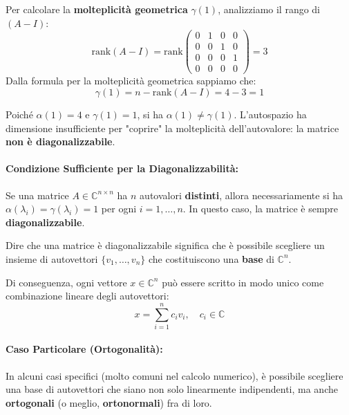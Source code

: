 \documentclass[a4paper,12pt]{article}
\begin{document}
	\medskip
	\noindent Per calcolare la \textbf{molteplicità geometrica} $\gamma(1)$, analizziamo il rango di $(A - I)$:
	\[
	\text{rank}(A - I) = \text{rank} \begin{pmatrix} 
		0 & 1 & 0 & 0 \\ 
		0 & 0 & 1 & 0 \\ 
		0 & 0 & 0 & 1 \\ 
		0 & 0 & 0 & 0 
	\end{pmatrix} = 3
	\]
	Dalla formula per la molteplicità geometrica sappiamo che:
	\[ \gamma(1) = n - \text{rank}(A - I) = 4 - 3 = 1 \]
	
	\begin{tcolorbox}[colback=red!5!white, colframe=red!75!black]
		Poiché $\alpha(1) = 4$ e $\gamma(1) = 1$, si ha $\alpha(1) \neq \gamma(1)$. 
		L'autospazio ha dimensione insufficiente per "coprire" la molteplicità dell'autovalore: la matrice \textbf{non è diagonalizzabile}.
	\end{tcolorbox}
	\paragraph{Condizione Sufficiente per la Diagonalizzabilità:}
	Se una matrice $A \in \mathbb{C}^{n \times n}$ ha $n$ autovalori \textbf{distinti}, allora necessariamente si ha $\alpha(\lambda_i) = \gamma(\lambda_i) = 1$ per ogni $i = 1, \dots, n$. In questo caso, la matrice è sempre \textbf{diagonalizzabile}.
	
	\begin{tcolorbox}[title=Interpretazione Geometrica]
		Dire che una matrice è diagonalizzabile significa che è possibile scegliere un insieme di autovettori $\{v_1, \dots, v_n\}$ che costituiscono una \textbf{base} di $\mathbb{C}^n$. 
		
		Di conseguenza, ogni vettore $x \in \mathbb{C}^n$ può essere scritto in modo unico come combinazione lineare degli autovettori:
		\begin{equation}
			x = \sum_{i=1}^{n} c_i v_i, \quad c_i \in \mathbb{C}
		\end{equation}
	\end{tcolorbox}
	
	\paragraph{Caso Particolare (Ortogonalità):} 
	In alcuni casi specifici (molto comuni nel calcolo numerico), è possibile scegliere una base di autovettori che siano non solo linearmente indipendenti, ma anche \textbf{ortogonali} (o meglio, \textbf{ortonormali}) fra di loro. 
	
\end{document}
